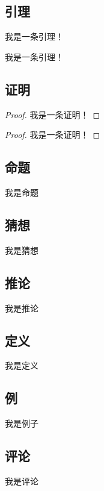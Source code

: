 \subsection{引理}
    \begin{lemma}
        我是一条引理！
    \end{lemma}
    \begin{lemma}
        我是一条引理！
    \end{lemma}
\subsection{证明}
    \begin{proof}
        我是一条证明！
    \end{proof}
    \begin{proof}
        我是一条证明！
    \end{proof}
\subsection{命题}
    \begin{props}
        我是命题
    \end{props}
\subsection{猜想}
    \begin{conj}
        我是猜想
    \end{conj}
\subsection{推论}
    \begin{infer}
        我是推论
    \end{infer}
\subsection{定义}
    \begin{defi}
        我是定义
    \end{defi}
\subsection{例}
    \begin{exmp}
        我是例子
    \end{exmp}
\subsection{评论}
    \begin{remark}
        我是评论
    \end{remark}
